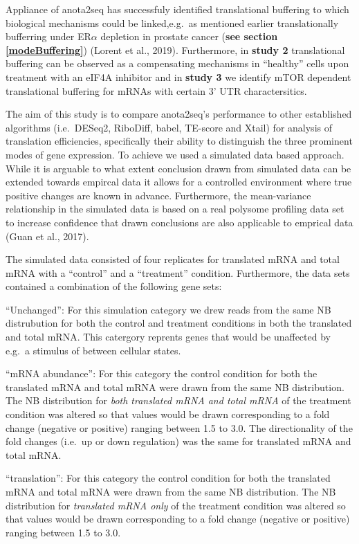 \documentclass[12pt,openany]{book}
\begin{document}
Appliance of anota2seq has successfuly identified translational
buffering to which biological mechanisms could be linked,e.g.~as
mentioned earlier translationally bufferring under ER\(\alpha\)
depletion in prostate cancer (\textbf{see section \ref{modeBuffering}})
(Lorent et al., 2019). Furthermore, in \textbf{study 2} translational
buffering can be observed as a compensating mechanisms in ``healthy''
cells upon treatment with an eIF4A inhibitor and in \textbf{study 3} we
identify mTOR dependent translational buffering for mRNAs with certain
3' UTR charactersitics.

The aim of this study is to compare anota2seq's performance to other
established algorithms (i.e.~DESeq2, RiboDiff, babel, TE-score and
Xtail) for analysis of translation efficiencies, specifically their
ability to distinguish the three prominent modes of gene expression. To
achieve we used a simulated data based approach. While it is arguable to
what extent conclusion drawn from simulated data can be extended towards
empircal data it allows for a controlled environment where true positive
changes are known in advance. Furthermore, the mean-variance
relationship in the simulated data is based on a real polysome profiling
data set to increase confidence that drawn conclusions are also
applicable to emprical data (Guan et al., 2017).

The simulated data consisted of four replicates for translated mRNA and
total mRNA with a ``control'' and a ``treatment'' condition.
Furthermore, the data sets contained a combination of the following gene
sets:

``Unchanged'': For this simulation category we drew reads from the same
NB distrubution for both the control and treatment conditions in both
the translated and total mRNA. This catergory reprents genes that would
be unaffected by e.g.~a stimulus of between cellular states.

``mRNA abundance'': For this category the control condition for both the
translated mRNA and total mRNA were drawn from the same NB distribution.
The NB distribution for \emph{both translated mRNA and total mRNA} of
the treatment condition was altered so that values would be drawn
corresponding to a fold change (negative or positive) ranging between
1.5 to 3.0. The directionality of the fold changes (i.e.~up or down
regulation) was the same for translated mRNA and total mRNA.

``translation'': For this category the control condition for both the
translated mRNA and total mRNA were drawn from the same NB distribution.
The NB distribution for \emph{translated mRNA only} of the treatment
condition was altered so that values would be drawn corresponding to a
fold change (negative or positive) ranging between 1.5 to 3.0.
\end{document}
